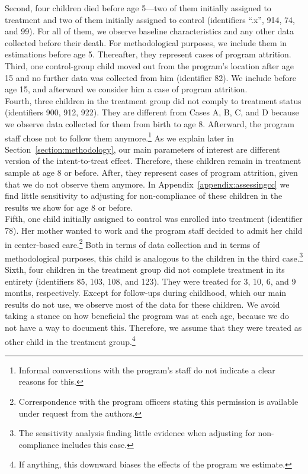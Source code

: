 \noindent Second, four children died before age 5---two of them initially assigned to treatment and two of them initially assigned to control (identifiers ``.x'', 914, 74, and 99). For all of them, we observe baseline characteristics and any other data collected before their death. For methodological purposes, we include them in estimations before age 5. Thereafter, they represent cases of program attrition.\\

\noindent Third, one control-group child moved out from the program's location after age 15 and no further data was collected from him (identifier 82). We include before age 15, and afterward we consider him a case of program attrition.\\

\noindent Fourth, three children in the treatment group did not comply to treatment status (identifiers 900, 912, 922). They are different from Cases A, B, C, and D because we observe data collected for them from birth to age 8. Afterward, the program staff chose not to follow them anymore.\footnote{Informal conversations with the program's staff do not indicate a clear reasons for this.} As we explain later in Section~\ref{section:methodology}, our main parameters of interest are different version of the intent-to-treat effect. Therefore, these children remain in treatment sample at age 8 or before. After, they represent cases of program attrition, given that we do not observe them anymore. In Appendix~\ref{appendix:assessingcc} we find little sensitivity to adjusting for non-compliance of these children in the results we show for age 8 or before.\\



\noindent Fifth, one child initially assigned to control was enrolled into treatment (identifier 78). Her mother wanted to work and the program staff decided to admit her child in center-based care.\footnote{Correspondence with the program officers stating this permission is available under request from the authors.} Both in terms of data collection and in terms of methodological purposes, this child is analogous to the children in the third case.\footnote{The sensitivity analysis finding little evidence when adjusting for non-compliance includes this case.}\\

\noindent Sixth, four children in the treatment group did not complete treatment in its entirety (identifiers 85, 103, 108, and 123). They were treated for 3, 10, 6, and 9 months, respectively. Except for follow-ups during childhood, which our main results do not use, we observe most of the data for these children. We avoid taking a stance on how beneficial the program was at each age, because we do not have a way to document this. Therefore, we assume that they were treated as other child in the treatment group.\footnote{If anything, this downward biases the effects of the program we estimate.} \\

